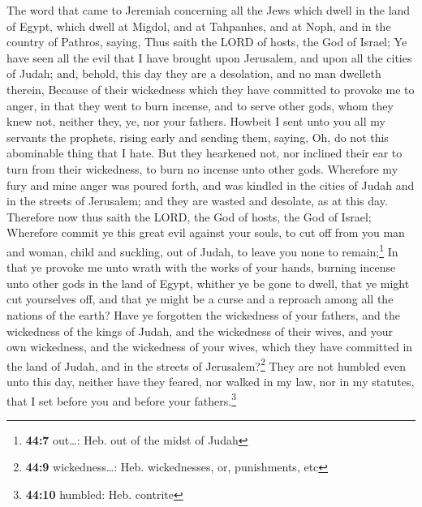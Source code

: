  The word that came to Jeremiah concerning all the Jews
which dwell in the land of Egypt, which dwell at Migdol, and at
Tahpanhes, and at Noph, and in the country of Pathros, saying,
 Thus saith the LORD of hosts, the God of Israel; Ye have
seen all the evil that I have brought upon Jerusalem, and upon all the
cities of Judah; and, behold, this day they are a desolation, and no man
dwelleth therein,  Because of their wickedness which they
have committed to provoke me to anger, in that they went to burn
incense, and to serve other gods, whom they knew not, neither they, ye,
nor your fathers.  Howbeit I sent unto you all my servants
the prophets, rising early and sending them, saying, Oh, do not this
abominable thing that I hate.  But they hearkened not, nor
inclined their ear to turn from their wickedness, to burn no incense
unto other gods.  Wherefore my fury and mine anger was
poured forth, and was kindled in the cities of Judah and in the streets
of Jerusalem; and they are wasted and desolate, as at this day.
 Therefore now thus saith the LORD, the God of hosts, the
God of Israel; Wherefore commit ye this great evil against your souls,
to cut off from you man and woman, child and suckling, out of Judah, to
leave you none to remain;\footnote{\textbf{44:7} out\ldots: Heb. out of
  the midst of Judah}  In that ye provoke me unto wrath
with the works of your hands, burning incense unto other gods in the
land of Egypt, whither ye be gone to dwell, that ye might cut yourselves
off, and that ye might be a curse and a reproach among all the nations
of the earth?  Have ye forgotten the wickedness of your
fathers, and the wickedness of the kings of Judah, and the wickedness of
their wives, and your own wickedness, and the wickedness of your wives,
which they have committed in the land of Judah, and in the streets of
Jerusalem?\footnote{\textbf{44:9} wickedness\ldots: Heb. wickednesses,
  or, punishments, etc}  They are not humbled even unto
this day, neither have they feared, nor walked in my law, nor in my
statutes, that I set before you and before your fathers.\footnote{\textbf{44:10}
  humbled: Heb. contrite}

